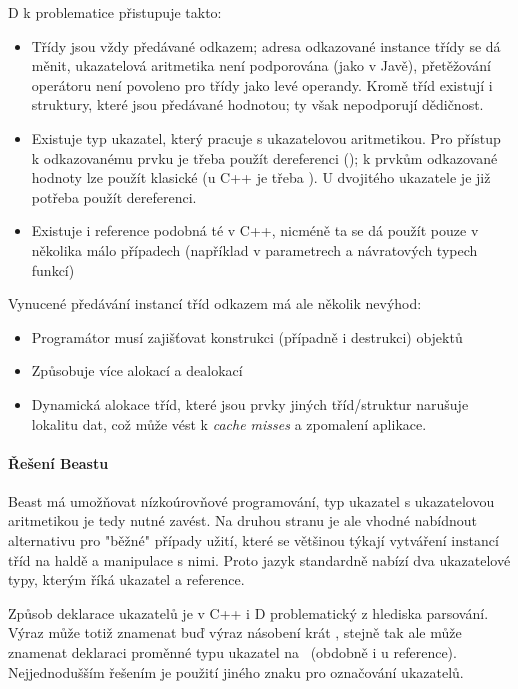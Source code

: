 D k problematice přistupuje takto:
\begin{itemize}
	\item Třídy jsou vždy předávané odkazem; adresa odkazované instance třídy se dá měnit, ukazatelová aritmetika není podporována (jako v Javě), přetěžování operátoru  není povoleno pro třídy jako levé operandy. Kromě tříd existují i struktury, které jsou předávané hodnotou; ty však nepodporují dědičnost.
	\item Existuje typ ukazatel, který pracuje s ukazatelovou aritmetikou. Pro přístup k odkazovanému prvku je třeba použít dereferenci (); k prvkům odkazované hodnoty lze použít klasické  (u C++ je třeba ). U dvojitého ukazatele je již potřeba použít dereferenci.
	\item Existuje i reference podobná té v C++, nicméně ta se dá použít pouze v několika málo případech (například v parametrech a návratových typech funkcí)
\end{itemize}

Vynucené předávání instancí tříd odkazem má ale několik nevýhod:
\begin{itemize}
	\item Programátor musí zajišťovat konstrukci (případně i destrukci) objektů
	\item Způsobuje více alokací a dealokací
	\item Dynamická alokace tříd, které jsou prvky jiných tříd/struktur narušuje lokalitu dat, což může vést k \textit{cache misses} a zpomalení aplikace.
\end{itemize}

\paragraph{Řešení Beastu} 
Beast má umožňovat nízkoúrovňové programování, typ ukazatel s ukazatelovou aritmetikou je tedy nutné zavést. Na druhou stranu je ale vhodné nabídnout alternativu pro "běžné" případy užití, které se většinou týkají vytváření instancí tříd na haldě a manipulace s nimi. Proto jazyk standardně nabízí dva ukazatelové typy, kterým říká ukazatel a reference.

Způsob deklarace ukazatelů je v C++ i D problematický z hlediska parsování. Výraz  může totiž znamenat buď výraz násobení  krát , stejně tak ale může znamenat deklaraci proměnné  typu ukazatel na ~(obdobně i u reference). Nejjednodušším řešením je použití jiného znaku pro označování ukazatelů.

